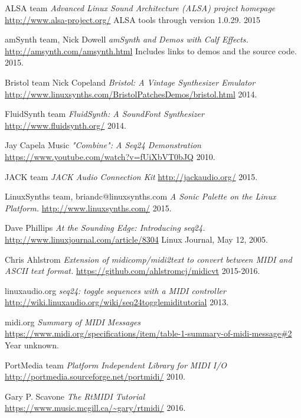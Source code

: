 \begin{thebibliography}{99}

   ALSA team
   \emph{Advanced Linux Sound Architecture (ALSA) project homepage}
   \url{http://www.alsa-project.org/}
   ALSA tools through version 1.0.29.
   2015

   amSynth team, Nick Dowell
   \emph{amSynth and Demos with Calf Effects.}
   \url{http://amsynth.com/amsynth.html}
   Includes links to demos and the source code.
   2015.

   Bristol team Nick Copeland
   \emph{Bristol: A Vintage Synthesizer Emulator}
   \url{http://www.linuxsynths.com/BristolPatchesDemos/bristol.html}
   2014.

   FluidSynth team
   \emph{FluidSynth: A SoundFont Synthesizer}
   \url{http://www.fluidsynth.org/}
   2014.

   Jay Capela Music
   \emph{"Combine": A Seq24 Demonstration}
   \url{https://www.youtube.com/watch?v=fUiXbVT0bJQ}
   2010.

   JACK team
   \emph{JACK Audio Connection Kit}
   \url{http://jackaudio.org/}
   2015.

   LinuxSynths team, briandc@linuxsynths.com
   \emph{A Sonic Palette on the Linux Platform.}
   \url{http://www.linuxsynths.com/}
   2015.

   Dave Phillips
   \emph{At the Sounding Edge: Introducing seq24.}
   \url{http://www.linuxjournal.com/article/8304}
   Linux Journal, May 12, 2005.

   Chris Ahlstrom
   \emph{Extension of midicomp/midi2text to convert between MIDI and ASCII
      text format.}
   \url{https://github.com/ahlstromcj/midicvt}
   2015-2016.

   linuxaudio.org
   \emph{seq24: toggle sequences with a MIDI controller}
   \url{http://wiki.linuxaudio.org/wiki/seq24togglemiditutorial}
   2013.

   midi.org
   \emph{Summary of MIDI Messages}
   \url{https://www.midi.org/specifications/item/table-1-summary-of-midi-message#2}
   Year unknown.

   PortMedia team
   \emph{Platform Independent Library for MIDI I/O}
   \url{http://portmedia.sourceforge.net/portmidi/}
   2010.

   Gary P. Scavone
   \emph{The RtMIDI Tutorial}
   \url{https://www.music.mcgill.ca/~gary/rtmidi/}
   2016.


\end{thebibliography}
